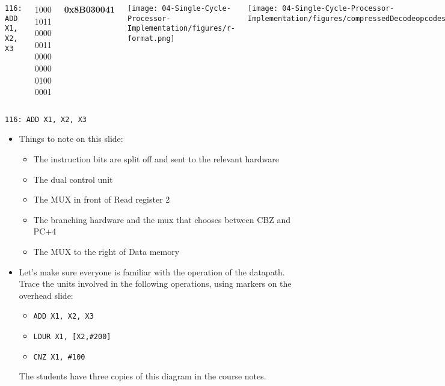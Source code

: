 \begin{frame}[fragile]\ifnum{}
\ifnum{}
\begin{columns}

        {\footnotesize \tt 116: {\color{red}ADD} {\color{orange}X1}, {\color{purple}X2}, {\color{blue}X3}
  
  {\color{red}1000 1011 000}{\color{blue}0 0011} 0000 00{\color{purple}00 010}{\color{orange}0 0001}}

{\footnotesize \textbf{0x8B030041}}

  \texttt{[image: 04-Single-Cycle-Processor-Implementation/figures/r-format.png]}

  

    \texttt{[image: 04-Single-Cycle-Processor-Implementation/figures/compressedDecodeopcodes.png]}

    \texttt{[image: 04-Single-Cycle-Processor-Implementation/figures/compressedDecodeSignals.png]}

    \vspace{5cm}

\end{columns}
\fi

\ifnum{}
{\tt 116: ADD X1, X2, X3}
\fi
  
  \else
\fi


\BNotes\ifnum{}
\begin{itemize}
\item Things to note on this slide:
\begin{itemize}
	\item The instruction bits are split off and sent to the
		relevant hardware
	\item The dual control unit
	\item The MUX in front of Read register 2
	\item The branching hardware and the mux that chooses between
		CBZ and PC+4
	\item The MUX to the right of Data memory
\end{itemize}
\item Let's
make sure everyone is familiar with the operation of the
datapath. Trace the units involved in the following operations, using
markers on the overhead slide:
\begin{itemize}
\item {\tt ADD X1, X2, X3}
\item {\tt LDUR X1, [X2,\#200]}
\item {\tt CNZ X1, \#100}
\end{itemize}
	The students have three copies of this diagram in the course notes.
\end{itemize}
\fi\ENotes
\end{frame}


